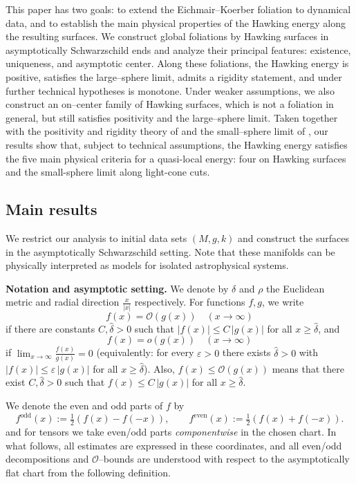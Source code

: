 \documentclass[12pt,a4paper]{amsart}
\theoremstyle{plain}
\theoremstyle{definition}
\begin{document}
This paper has two goals: to extend the Eichmair–Koerber foliation \cite{eichko} to dynamical data, and to establish the main physical properties of the Hawking energy along the resulting surfaces. We construct global foliations by Hawking surfaces in asymptotically Schwarzschild ends and analyze their principal features: existence, uniqueness, and asymptotic center. Along these foliations, the Hawking energy is positive, satisfies the large–sphere limit, admits a rigidity statement, and under further technical hypotheses is monotone. Under weaker assumptions, we also construct an on–center family of Hawking surfaces, which is not a foliation in general, but still satisfies positivity and the large–sphere limit. Taken together with the positivity and rigidity theory of \cite{rigidiaz} and the small–sphere limit of \cite{Haw}, our results show that, subject to technical assumptions, the Hawking energy satisfies the five main physical criteria for a quasi-local energy: four on Hawking surfaces and the small-sphere limit along light-cone cuts.
\subsection{Main results}


We restrict our analysis to initial data sets $(M,g,k)$ and construct the surfaces in the asymptotically Schwarzschild setting. Note that these  manifolds  can be physically interpreted as models for isolated astrophysical
systems.
 



\textbf{Notation and asymptotic setting.} We  denote by $\delta$ and $\rho$ the Euclidean metric and  radial direction $\frac{x}{|x|}$ respectively. For functions \(f,g\), we write
\[
f(x)=\mathcal{O}(g(x))\quad(x\to\infty)
\]
if there are constants \(C,\hat{\delta}>0\) such that \(|f(x)|\le C\,|g(x)|\) for all \(x\ge\hat{\delta}\), and
\[
f(x)=o(g(x))\quad(x\to\infty)
\]
if \(\lim_{x\to\infty}\frac{f(x)}{g(x)}=0\)
(equivalently: for every \(\varepsilon>0\) there exists \(\hat{\delta}>0\) with \(|f(x)|\le\varepsilon\,|g(x)|\) for all \(x\ge\hat{\delta}\)).
 Also, \(f(x)\le \mathcal{O}(g(x))\) means that there exist \(C,\hat{\delta}>0\) such that \(f(x)\le C\,|g(x)|\) for all \(x\ge\hat{\delta}\).


We denote the even and odd parts of $f$ by
\[
f^{\mathrm{odd}}(x) := \tfrac{1}{2}(f(x) - f(-x)), \qquad
f^{\mathrm{even}}(x) := \tfrac{1}{2}(f(x) + f(-x)).
\]
and for tensors we take even/odd parts \emph{componentwise} in the chosen chart.  In what follows, all estimates are expressed in these coordinates, and all even/odd decompositions and $\mathcal{O}$–bounds are understood with respect to the asymptotically flat chart from the following definition.
\end{document}
